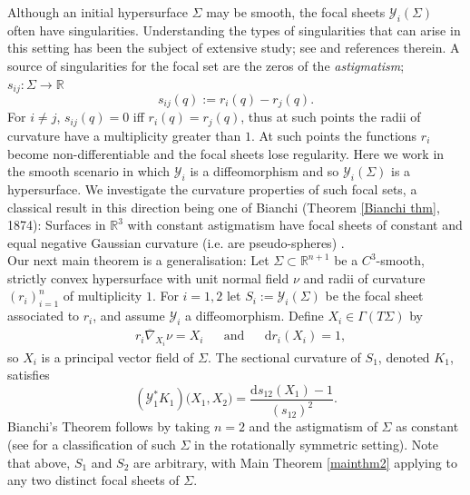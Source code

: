 \documentclass[12pt]{amsart}
\theoremstyle{plain}
\newenvironment{Mainthm}[1]{%
  \IfBlankTF{#1}
    {\renewcommand{\theMainthminner}{\unskip}}
    {\renewcommand\theMainthminner{#1}}%
  \Mainthminner
}{\endMainthminner}
\theoremstyle{definition}
\def\R{\mathbb{R}}
\newcommand{\td}{\mathrm{d}}
\numberwithin{equation}{section}
\begin{document}
Although an initial hypersurface $\Sigma$ may be smooth, the focal sheets $\mathcal{Y}_i(\Sigma)$ often have singularities. Understanding the types of singularities that can arise in this setting has been the subject of extensive study; see \cite{A90} \cite{BW91} \cite{BT23} \cite{Port71} and references therein. A source of singularities for the focal set are the zeros of the \textit{astigmatism}; $s_{ij}:\Sigma \to \R$
\begin{equation}
    s_{ij}(q):=r_i(q)-r_j(q).
\end{equation}
For $i\neq j$, $s_{ij}(q)=0$ iff $r_i(q)=r_j(q)$, thus at such points the radii of curvature have a multiplicity greater than $1$. At such points the functions $r_i$ become non-differentiable and the focal sheets lose regularity.
Here we work in the smooth scenario in which $\mathcal{Y}_i$ is a diffeomorphism and so $\mathcal{Y}_i(\Sigma)$ is a hypersurface. We investigate the curvature properties of such focal sets, a classical result in this direction being one of Bianchi (Theorem \ref{Bianchi thm}, 1874): Surfaces in $\R^3$ with constant astigmatism have focal sheets of constant and equal negative Gaussian curvature (i.e. are pseudo-spheres) \cite{B1874}.\\ Our next main theorem is a generalisation:
\begin{Mainthm}{2}\label{mainthm2}
Let $\Sigma\subset \R^{n+1}$ be a $C^3$-smooth, strictly convex hypersurface with unit normal field $\nu$ and radii of curvature $(r_i)_{i=1}^n$ of multiplicity $1$. For $i=1,2$ let $S_i:=\mathcal{Y}_i(\Sigma)$ be the focal sheet associated to $r_i$, and assume $\mathcal{Y}_i$ a diffeomorphism. Define $X_i\in\Gamma(T\Sigma)$ by
    \begin{align}\label{eq: normalised p vector}
       &r_i\overline{\nabla}_{X_i}\nu =X_i &&\text{and} &&\td r_i(X_i)=1,
    \end{align}
     so $X_i$ is a principal vector field of $\Sigma$. The sectional curvature of $S_1$, denoted $K_1$, satisfies
    \begin{equation*}
    (\mathcal{Y}_1^\ast K_1)\big(X_1,X_2)=\frac{\td s_{12}(X_1)-1}{(s_{12})^2}.
    \end{equation*}
\end{Mainthm}
Bianchi's Theorem follows by taking $n=2$ and the astigmatism of $\Sigma$ as constant (see \cite{LP20} for a classification of such $\Sigma$ in the rotationally symmetric setting). Note that above, $S_1$ and $S_2$ are arbitrary, with Main Theorem \ref{mainthm2} applying to any two distinct focal sheets of $\Sigma$.
\end{document}

